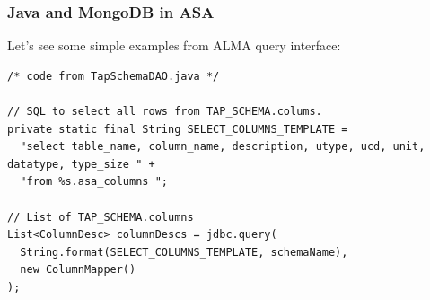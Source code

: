 \subsubsection{Java and MongoDB in ASA}

Let's see some simple examples from ALMA query interface: 

\newpage
\begin{lstlisting}
/* code from TapSchemaDAO.java */

// SQL to select all rows from TAP_SCHEMA.colums.
private static final String SELECT_COLUMNS_TEMPLATE = 
  "select table_name, column_name, description, utype, ucd, unit, datatype, type_size " +
  "from %s.asa_columns ";

// List of TAP_SCHEMA.columns
List<ColumnDesc> columnDescs = jdbc.query(
  String.format(SELECT_COLUMNS_TEMPLATE, schemaName),
  new ColumnMapper()
);


\end{lstlisting}

% 
% 